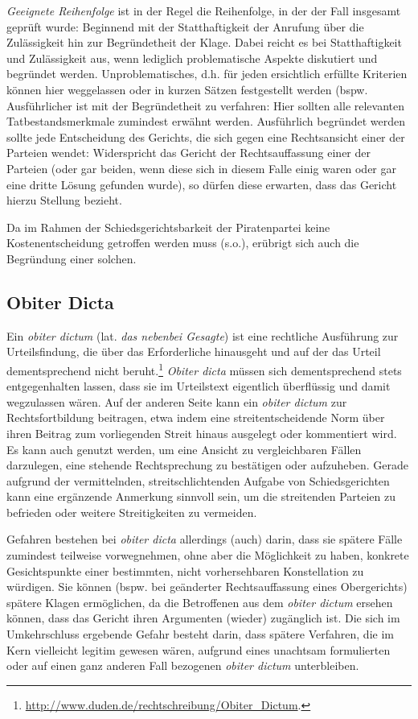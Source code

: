 \emph{Geeignete Reihenfolge} ist in der Regel die Reihenfolge, in der der Fall insgesamt geprüft wurde: Beginnend mit der Statthaftigkeit der Anrufung über die Zulässigkeit hin zur Begründetheit der Klage. Dabei reicht es bei Statthaftigkeit und Zulässigkeit aus, wenn lediglich problematische Aspekte diskutiert und begründet werden. Unproblematisches, d.h. für jeden ersichtlich erfüllte Kriterien können hier weggelassen oder in kurzen Sätzen festgestellt werden (bspw.  Ausführlicher ist mit der Begründetheit zu verfahren: Hier sollten alle relevanten Tatbestandsmerkmale zumindest erwähnt werden. Ausführlich begründet werden sollte jede Entscheidung des Gerichts, die sich gegen eine Rechtsansicht einer der Parteien wendet: Widerspricht das Gericht der Rechtsauffassung einer der Parteien (oder gar beiden, wenn diese sich in diesem Falle einig waren oder gar eine dritte Lösung gefunden wurde), so dürfen diese erwarten, dass das Gericht hierzu Stellung bezieht.

Da im Rahmen der Schiedsgerichtsbarkeit der Piratenpartei keine Kostenentscheidung getroffen werden muss (s.o.), erübrigt sich auch die Begründung einer solchen.

\subsection{Obiter Dicta}
Ein \emph{obiter dictum} (lat. \emph{das nebenbei Gesagte}) ist eine rechtliche Ausführung zur Urteilsfindung, die über das Erforderliche hinausgeht und auf der das Urteil dementsprechend nicht beruht.\footnote{\url{http://www.duden.de/rechtschreibung/Obiter_Dictum}.} \emph{Obiter dicta} müssen sich dementsprechend stets entgegenhalten lassen, dass sie im Urteilstext eigentlich überflüssig und damit wegzulassen wären. Auf der anderen Seite kann ein \emph{obiter dictum} zur Rechtsfortbildung beitragen, etwa indem eine streitentscheidende Norm über ihren Beitrag zum vorliegenden Streit hinaus ausgelegt oder kommentiert wird. Es kann auch genutzt werden, um eine Ansicht zu vergleichbaren Fällen darzulegen, eine stehende Rechtsprechung zu bestätigen oder aufzuheben. Gerade aufgrund der vermittelnden, streitschlichtenden Aufgabe von Schiedsgerichten kann eine ergänzende Anmerkung sinnvoll sein, um die streitenden Parteien zu befrieden oder weitere Streitigkeiten  zu vermeiden.

Gefahren bestehen bei \emph{obiter dicta} allerdings (auch) darin, dass sie spätere Fälle zumindest teilweise vorwegnehmen, ohne aber die Möglichkeit zu haben, konkrete Gesichtspunkte einer bestimmten, nicht vorhersehbaren Konstellation zu würdigen. Sie können (bspw. bei geänderter Rechtsauffassung eines Obergerichts) spätere Klagen ermöglichen, da die Betroffenen aus dem \emph{obiter dictum} ersehen können, dass das Gericht ihren Argumenten (wieder) zugänglich ist. Die sich im Umkehrschluss ergebende Gefahr besteht darin, dass spätere Verfahren, die im Kern vielleicht legitim gewesen wären, aufgrund eines unachtsam formulierten oder auf einen ganz anderen Fall bezogenen \emph{obiter dictum} unterbleiben.

